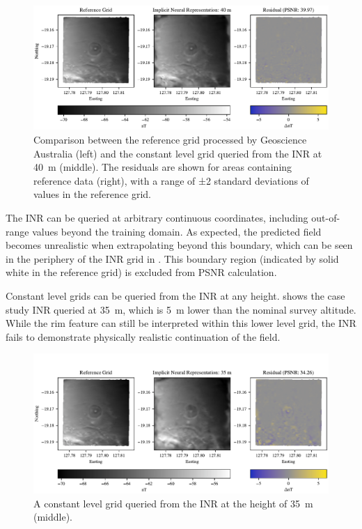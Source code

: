 \documentclass[manuscript.tex]{subfiles}
\begin{document}
\begin{figure}[hbt]
    \centering{}
    \includegraphics[width=1.0\linewidth]{fig/p3/P864_grid_comparison_40m.pdf}
    \caption[Grid prediction at the nominal altitude]{Comparison between the reference grid processed by Geoscience Australia (left) and the constant level grid queried from the INR at \qty{40}{\m} (middle). The residuals are shown for areas containing reference data (right), with a range of ±2 standard deviations of values in the reference grid.}
    \label{fig:grid40}
\end{figure}

The INR can be queried at arbitrary continuous coordinates, including out-of-range values beyond the training domain.
As expected, the predicted field becomes unrealistic when extrapolating beyond this boundary, which can be seen in the periphery of the INR grid in .
This boundary region (indicated by solid white in the reference grid) is excluded from PSNR calculation.

Constant level grids can be queried from the INR at any height.
 shows the case study INR queried at \qty{35}{\m}, which is \qty{5}{\m} lower than the nominal survey altitude.
While the rim feature can still be interpreted within this lower level grid, the INR fails to demonstrate physically realistic continuation of the field.

\begin{figure}[hbt]
    \centering{}
    \includegraphics[width=1.0\linewidth]{fig/p3/P864_grid_comparison_35m.pdf}
    \caption[Grid prediction outside the nominal altitude]{A constant level grid queried from the INR at the height of \qty{35}{\m} (middle).}
    \label{fig:grid35}
\end{figure}
\end{document}
